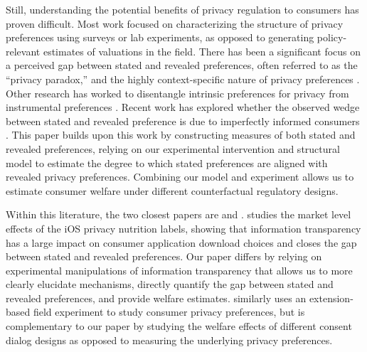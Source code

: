 \documentclass[12pt]{article}
\theoremstyle{definition}
\theoremstyle{remark}
\begin{document}
Still, understanding the potential benefits of privacy regulation to consumers has proven difficult. Most work focused on characterizing the structure of privacy preferences using surveys or lab experiments, as opposed to generating policy-relevant estimates of valuations in the field. There has been a significant focus on a perceived gap between stated and revealed preferences, often referred to as the ``privacy paradox,'' \citep{spiekermann2001privacy, acquisti2006imagined, norberg2007privacy, athey2025digital} and the highly context-specific nature of privacy preferences \citep{acquisti2013privacy}. Other research has worked to disentangle intrinsic preferences for privacy from instrumental preferences \citep{lin2022}. Recent work has explored whether the observed wedge between stated and revealed preference is due to imperfectly informed consumers  \citep{tsai2011effect, f4d6c48d-b77c-3568-b51c-5946aee2b9de, adjerid2019choice, bian2021supply, infromationfrictions}. This paper builds upon this work by constructing measures of both stated and revealed preferences, relying on our experimental intervention and structural model to estimate the degree to which stated preferences are aligned with revealed privacy preferences. Combining our model and experiment allows us to estimate consumer welfare under different counterfactual regulatory designs.

Within this literature, the two closest papers are \cite{bian2021supply} and \cite{fradkin2024data}. \cite{bian2021supply} studies the market level effects of the iOS privacy nutrition labels, showing that information transparency has a large impact on consumer application download choices and closes the gap between stated and revealed preferences. Our paper differs by relying on experimental manipulations of information transparency that allows us to more clearly elucidate mechanisms, directly quantify the gap between stated and revealed preferences, and provide welfare estimates. \cite{fradkin2024data} similarly uses an extension-based field experiment to study consumer privacy preferences, but is complementary to our paper by studying the welfare effects of different consent dialog designs as opposed to measuring the underlying privacy preferences.
\end{document}
